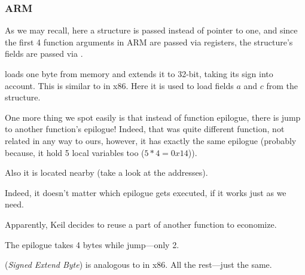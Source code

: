 \subsubsection{ARM}

\myparagraph{\OptimizingKeilVI (\ThumbMode)}



As we may recall, here a structure is passed instead of pointer to one,
and since the first 4 function arguments in ARM are passed via registers,
the structure's fields are passed via .

 loads one byte from memory and extends it to 32-bit, taking its sign into account.
This is similar to \MOVSX in x86.
Here it is used to load fields $a$ and $c$ from the structure.


One more thing we spot easily is that instead of function epilogue, there is jump to another function's epilogue!
Indeed, that was quite different function, not related in any way to ours, however, it has exactly
the same epilogue 
(probably because, it hold 5 local variables too 
($5*4=0x14$)).

Also it is located nearby (take a look at the addresses).

Indeed, it doesn't matter which epilogue gets executed,
if it works just as we need.

Apparently, Keil decides to reuse a part of another function to economize.

The epilogue takes 4 bytes while jump---only 2.




 (\emph{Signed Extend Byte}) is analogous to \MOVSX in x86.
All the rest---just the same.

